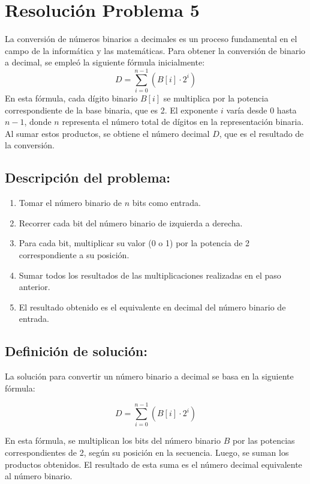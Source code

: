 \section{Resolución Problema 5}
La conversión de números binarios a decimales es un proceso fundamental en el campo de la informática y las matemáticas. Para obtener la conversión de binario a decimal, se empleó la siguiente fórmula inicialmente:
\begin{equation}
D = \sum_{i=0}^{n-1} (B[i] \cdot 2^i) 
\end{equation} 
En esta fórmula, cada dígito binario $B [i]$ se multiplica por la potencia correspondiente de la base binaria, que es 2. El exponente $i$ varía desde 0 hasta $n-1$, donde $n$ representa el número total de dígitos en la representación binaria. Al sumar estos productos, se obtiene el número decimal $D$, que es el resultado de la conversión. 
\subsection{\textbf{Descripción del problema:}}
\begin{enumerate}
\item Tomar el número binario de $n$ bits como entrada.
  \item Recorrer cada bit del número binario de izquierda a derecha.
  \item Para cada bit, multiplicar su valor (0 o 1) por la potencia de 2 correspondiente a su posición.
  \item Sumar todos los resultados de las multiplicaciones realizadas en el paso anterior.
  \item El resultado obtenido es el equivalente en decimal del número binario de entrada.
\end{enumerate}
\subsection{\textbf{Definición de solución:}}
La solución para convertir un número binario a decimal se basa en la siguiente fórmula:

\begin{equation}
D = \sum_{i=0}^{n-1} (B[i] \cdot 2^i)
\end{equation}

En esta fórmula, se multiplican los bits del número binario $B$ por las potencias correspondientes de 2, según su posición en la secuencia. Luego, se suman los productos obtenidos. El resultado de esta suma es el número decimal equivalente al número binario.
